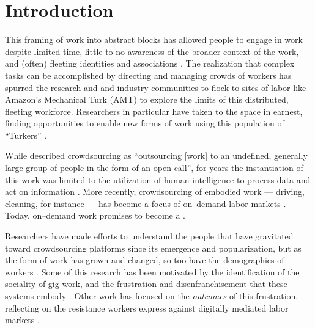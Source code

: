 \documentclass[trackingWork]{subfiles}
\begin{document}
\section{Introduction}
This framing of work into abstract blocks
has allowed people to engage in work despite
limited time,
little to no awareness of the broader context of the work, and 
(often) fleeting identities and associations
\cite{kargerIterativeLearning,mitraComparingStrategies,latozaCrowdDev}.
The realization
that complex tasks can be accomplished by directing and managing crowds of workers
has spurred the research and and industry communities to flock to sites of labor
like Amazon's Mechanical Turk (AMT)
to explore the limits of this distributed, fleeting workforce.
Researchers in particular have taken to the space in earnest,
finding opportunities to enable new forms of work
using this population of ``Turkers''
\cite{bernsteinSoylent,redballoon,paolacci2010running}.

While \citeauthor{howe2008crowdsourcing} described crowdsourcing as
``outsourcing [work] to an undefined, generally large group of people in the form of an open call'',
for years the instantiation of this work was limited to the utilization of
human intelligence to process data and act on information
\cite{CrowdsourcingUserStudies,movieSummarizationWu,
      yuenSurvey,geiger2011managing,quinnbedersonTaxonomy}.
More recently, crowdsourcing of embodied work
--- driving, cleaning, for instance ---
has become a focus of on--demand labor markets
\cite{uberAlgorithm,uberOfficial,zaarlyOfficial,taskrabbitOfficial}.
Today, on--demand work promises to become a 
.

Researchers have made efforts to understand the people
that have gravitated toward crowdsourcing platforms
since its emergence and popularization,
but as the form of work has grown and changed, so too have the demographics of workers
\cite{Ross,whoareNOTtheTurkers}.
Some of this research has been motivated by the identification of the sociality of gig work,
and the frustration and disenfranchisement that these systems embody
\cite{turkopticon,dynamo}.
Other work has focused on the \textit{outcomes} of this frustration,
reflecting on the resistance workers express against digitally mediated labor markets
\cite{uberAlgorithm}.
\end{document}

